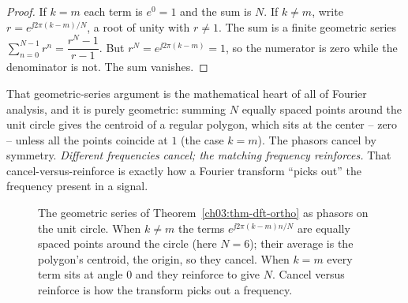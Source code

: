 \begin{proof}
If $k=m$ each term is $e^0=1$ and the sum is $N$. If $k\neq m$, write $r=e^{\jj 2\pi(k-m)/N}$, a
root of unity with $r\neq 1$. The sum is a finite geometric series
$\sum_{n=0}^{N-1} r^n = \dfrac{r^N-1}{r-1}$. But $r^N = e^{\jj 2\pi(k-m)} = 1$, so the numerator is
zero while the denominator is not. The sum vanishes.
\end{proof}

\begin{happeningbox}
That geometric-series argument is the mathematical heart of all of Fourier analysis, and it is
purely geometric: summing $N$ equally spaced points around the unit circle gives the centroid of a
regular polygon, which sits at the center -- zero -- unless all the points coincide at $1$ (the case
$k=m$). The phasors cancel by symmetry. \emph{Different frequencies cancel; the matching frequency
reinforces.} That cancel-versus-reinforce is exactly how a Fourier transform ``picks out'' the
frequency present in a signal.
\end{happeningbox}

\begin{figure}[H]
\centering
{}
\caption{The geometric series of Theorem~\ref{ch03:thm-dft-ortho} as phasors on the unit circle.
When $k\neq m$ the terms $e^{\jj 2\pi(k-m)n/N}$ are equally spaced points around the circle (here
$N=6$); their average is the polygon's centroid, the origin, so they cancel. When $k=m$ every term
sits at angle $0$ and they reinforce to give $N$. Cancel versus reinforce is how the transform picks
out a frequency.}
\label{ch03:fig-phasor-sum}
\end{figure}

